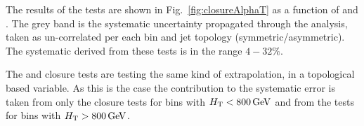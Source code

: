 The results of the tests are shown in Fig.~\ref{fig:closureAlphaT} as
a function of \scalht and \njet.  The grey band is the systematic
uncertainty propagated through the analysis, taken as un-correlated
per each \scalht bin and jet topology (symmetric/asymmetric). The
systematic derived from these tests is in the range $4-32\%$.

The \bdphi and \alphat closure tests are testing the same kind of
extrapolation, in a topological \met based variable. As this is the
case the contribution to the systematic error is taken from only the
\alphat closure tests for bins with $\mbox{$H_\text{T}$}<800\mathrm{\,Ge\kern -0.1em V}$ and from the
\bdphi tests for bins with $\mbox{$H_\text{T}$}>800\mathrm{\,Ge\kern -0.1em V}$.

\begin{figure}[h!]
  \begin{center}
    ~~
    \\
    ~~


\end{center}
\end{figure}
